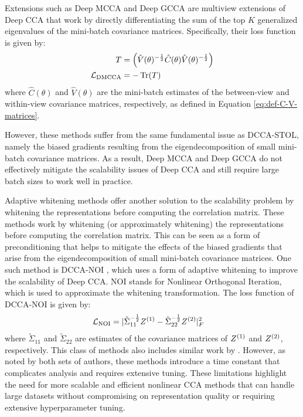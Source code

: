 Extensions such as Deep MCCA \citep{somandepalli2019multimodal} and Deep GCCA \citep{benton2017deep} are multiview extensions of Deep CCA that work by directly differentiating the sum of the top $K$ generalized eigenvalues of the mini-batch covariance matrices. Specifically, their loss function is given by:
\begin{align}
    T      & = \left(\hat{V}(\theta)^{-\frac{1}{2}} \hat{C}(\theta)\hat{V}(\theta)^{-\frac{1}{2}}\right) \\
    \mathcal{L}_\text{DMCCA} & = -\operatorname{Tr}(T)
\end{align}
where $\hat{C}(\theta)$ and $\hat{V}(\theta)$ are the mini-batch estimates of the between-view and within-view covariance matrices, respectively, as defined in Equation \eqref{eq:def-C-V-matrices}.

However, these methods suffer from the same fundamental issue as DCCA-STOL, namely the biased gradients resulting from the eigendecomposition of small mini-batch covariance matrices. As a result, Deep MCCA and Deep GCCA do not effectively mitigate the scalability issues of Deep CCA and still require large batch sizes to work well in practice.

Adaptive whitening methods \citep{wang2015stochastic, chang2018scalable} offer another solution to the scalability problem by whitening the representations before computing the correlation matrix.
These methods work by whitening (or approximately whitening) the representations before computing the correlation matrix. This can be seen as a form of preconditioning that helps to mitigate the effects of the biased gradients that arise from the eigendecomposition of small mini-batch covariance matrices. 
One such method is DCCA-NOI \citep{wang2015unsupervised}, which uses a form of adaptive whitening to improve the scalability of Deep CCA. NOI stands for Nonlinear Orthogonal Iteration, which is used to approximate the whitening transformation. The loss function of DCCA-NOI is given by:
\begin{align}
    \mathcal{L}_\text{NOI} & = |{\tilde{\Sigma}_{11}}^{-\frac{1}{2}} Z^{(1)}-{\tilde{\Sigma}_{22}}^{-\frac{1}{2}} Z^{(2)}|^2_F
\end{align}
where $\tilde{\Sigma}_{11}$ and $\tilde{\Sigma}_{22}$ are estimates of the covariance matrices of $Z^{(1)}$ and $Z^{(2)}$, respectively. This class of methods also includes similar work by \citet{chang2018scalable}.
However, as noted by both sets of authors, these methods introduce a time constant that complicates analysis and requires extensive tuning.
These limitations highlight the need for more scalable and efficient nonlinear CCA methods that can handle large datasets without compromising on representation quality or requiring extensive hyperparameter tuning.

